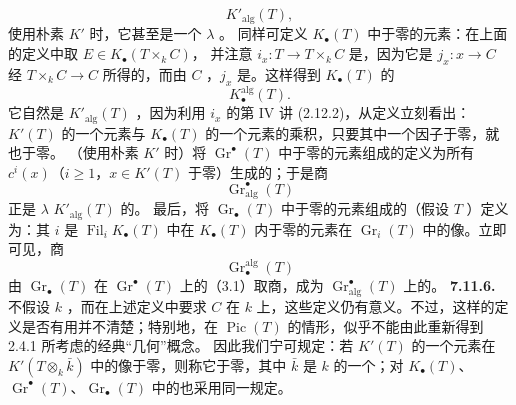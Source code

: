 \[K'_{\mathrm{alg}}(T),\tag{7.11.2}\]
使用朴素 $K'$ 时，它甚至是一个 $\lambda$ 。
同样可定义 $K_\bullet(T)$ 中于零的元素：在上面的定义中取 $E\in K_\bullet(T\times_k C)$，
并注意 $i_x:T\to T\times_k C$ 是，因为它是 $j_x:x\to C$ 经 $T\times_k C\to C$ 所得的，而由 $C$ ，$j_x$ 是。这样得到 $K_\bullet(T)$ 的
\[K_\bullet^{\mathrm{alg}}(T).\tag{7.11.3}\]
它自然是 $K'_{\mathrm{alg}}(T)$ ，因为利用 $i_x$ 的第 IV 讲 (2.12.2)，从定义立刻看出：$K'(T)$ 的一个元素与 $K_\bullet(T)$ 的一个元素的乘积，只要其中一个因子于零，就也于零。
（使用朴素 $K'$ 时）将 $\operatorname{Gr}^{\bullet}(T)$ 中于零的元素组成的定义为所有 $c^i(x)$（$i\geq1$，$x\in K'(T)$ 于零）生成的；于是商
\[\operatorname{Gr}^{\bullet}_{\mathrm{alg}}(T)\tag{7.11.4}\]
正是 $\lambda$  $K'_{\mathrm{alg}}(T)$ 的。
最后，将 $\operatorname{Gr}_\bullet(T)$ 中于零的元素组成的（假设 $T$ ）定义为：其 $i$ 是 $\operatorname{Fil}_iK_\bullet(T)$ 中在 $K_\bullet(T)$ 内于零的元素在 $\operatorname{Gr}_i(T)$ 中的像。立即可见，商
\[\operatorname{Gr}_\bullet^{\mathrm{alg}}(T)\tag{7.11.5}\]
由 $\operatorname{Gr}_\bullet(T)$ 在 $\operatorname{Gr}^{\bullet}(T)$ 上的（3.1）取商，成为 $\operatorname{Gr}^{\bullet}_{\mathrm{alg}}(T)$ 上的。
\textbf{7.11.6.} 不假设 $k$ ，而在上述定义中要求 $C$ 在 $k$ 上，这些定义仍有意义。不过，这样的定义是否有用并不清楚；特别地，在 $\operatorname{Pic}(T)$ 的情形，似乎不能由此重新得到 2.4.1 所考虑的经典“几何”概念。
因此我们宁可规定：若 $K'(T)$ 的一个元素在 $K'(T\otimes_k\bar k)$ 中的像于零，则称它于零，其中 $\bar k$ 是 $k$ 的一个；对 $K_\bullet(T)$、$\operatorname{Gr}^{\bullet}(T)$、$\operatorname{Gr}_\bullet(T)$ 中的也采用同一规定。
